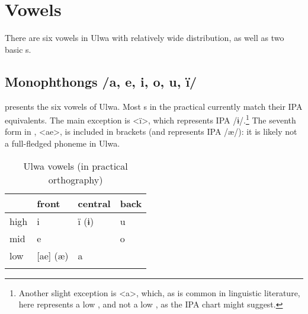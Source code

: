 
\newpage

\section{Vowels}\label{sec:2.2}


There are six vowels in Ulwa with relatively wide distribution, as well as two basic s.


\subsection{Monophthongs /a, e, i, o, u, ï/}\label{sec:2.2.1}


 presents the six vowels of Ulwa. Most s in the practical  currently match their IPA equivalents. The main exception is <ï>, which represents IPA /ɨ/.\footnote{Another slight exception is <a>, which, as is common in linguistic literature, here represents a  low , and not a  low , as the IPA  chart might suggest.} The seventh form in , <ae>, is included in brackets (and represents IPA /æ/): it is likely not a full-fledged phoneme in Ulwa.

\begin{table}
\caption{Ulwa vowels (in practical orthography)}
\label{tab:2.2}
\begin{tabular}{llll}
\lsptoprule
& front & central & back\\
\midrule
high & i & ï (ɨ) & u\\
mid & e &  & o\\
low & [ae] (æ) & a & \\
\lspbottomrule
\end{tabular}
\end{table}



